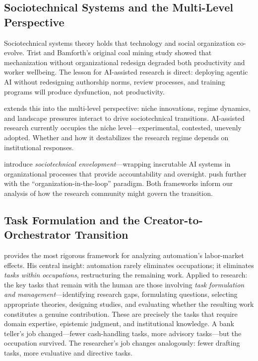 \documentclass{article}
\begin{document}
\subsection{Sociotechnical Systems and the Multi-Level Perspective}

Sociotechnical systems theory \citep{trist1951social} holds that technology and social organization co-evolve. Trist and Bamforth's original coal mining study showed that mechanization without organizational redesign degraded both productivity and worker wellbeing. The lesson for AI-assisted research is direct: deploying agentic AI without redesigning authorship norms, review processes, and training programs will produce dysfunction, not productivity.

\citet{geels2010transitions} extends this into the multi-level perspective: niche innovations, regime dynamics, and landscape pressures interact to drive sociotechnical transitions. AI-assisted research currently occupies the niche level---experimental, contested, unevenly adopted. Whether and how it destabilizes the research regime depends on institutional responses.

\citet{asatiani2021envelopment} introduce \textit{sociotechnical envelopment}---wrapping inscrutable AI systems in organizational processes that provide accountability and oversight. \citet{herrmann2022keeping} push further with the ``organization-in-the-loop'' paradigm. Both frameworks inform our analysis of how the research community might govern the transition.

\subsection{Task Formulation and the Creator-to-Orchestrator Transition}

\citet{autor2015why} provides the most rigorous framework for analyzing automation's labor-market effects. His central insight: automation rarely eliminates occupations; it eliminates \textit{tasks within occupations}, restructuring the remaining work. Applied to research: the key tasks that remain with the human are those involving \textit{task formulation and management}---identifying research gaps, formulating questions, selecting appropriate theories, designing studies, and evaluating whether the resulting work constitutes a genuine contribution. These are precisely the tasks that require domain expertise, epistemic judgment, and institutional knowledge. A bank teller's job changed---fewer cash-handling tasks, more advisory tasks---but the occupation survived. The researcher's job changes analogously: fewer drafting tasks, more evaluative and directive tasks.
\end{document}
